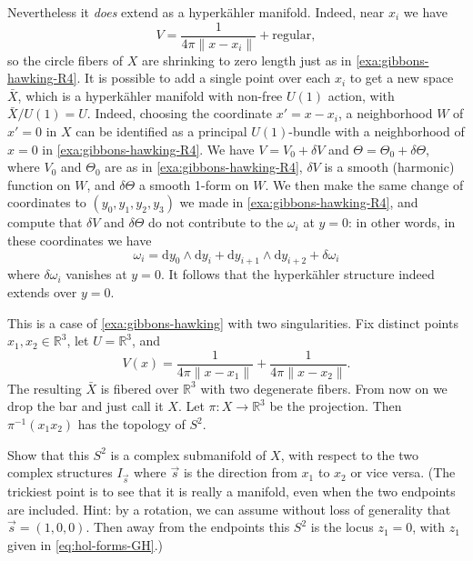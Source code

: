 \documentclass[12pt,letterpaper,reqno]{article}
\numberwithin{equation}{section}
\newcommand{\R}{\ensuremath{\mathbb R}}
\newcommand{\hk}{hyperk\"ahler\xspace}
\newcommand{\de}{\mathrm{d}}
\newcommand{\norm}[1]{\lVert#1\rVert}
\newcommand{\ti}[1]{\textit{#1}}
\newcommand{\insfig}[2]{

\medskip
\noindent
\begin{minipage}{\linewidth}

\makebox[\linewidth]{\texttt{[image: figures/\#1-crop.pdf]}}

\end{minipage}
\medskip

}
\begin{document}
\begin{example}
Nevertheless it \ti{does} extend as a \hk manifold.
Indeed, near $x_i$ we have
\begin{equation}
V = \frac{1}{4\pi\norm{x - x_i}} + \text{regular},
\end{equation}
so the circle fibers of $X$ are shrinking to zero
length just as in \autoref{exa:gibbons-hawking-R4}.
It is possible to add a single point over each $x_i$
to get a new space $\bar X$, which is a \hk manifold with non-free
$U(1)$ action, with $\bar X / U(1) = U$.
Indeed, choosing the coordinate $x' = x - x_i$,
a neighborhood $W$ of $x' = 0$ in $X$ can be identified as a
principal $U(1)$-bundle with a neighborhood of $x = 0$
in \autoref{exa:gibbons-hawking-R4}. We have
$V = V_0 + \delta V$ and $\Theta = \Theta_0 + \delta \Theta$,
where $V_0$ and $\Theta_0$ are as in \autoref{exa:gibbons-hawking-R4},
$\delta V$ is a smooth (harmonic) function on $W$,
and $\delta \Theta$ a smooth 1-form on $W$.
We then make the same change of coordinates
to $(y_0,y_1,y_2,y_3)$ we made in
\autoref{exa:gibbons-hawking-R4}, and compute that $\delta V$
and $\delta \Theta$ do not contribute to the $\omega_i$ at
$y=0$: in other words, in these coordinates we have
\begin{equation} \label{eq:gibbons-hawking-near-singularity}
  \omega_i = \de y_0 \wedge \de y_i + \de y_{i+1} \wedge \de y_{i+2} + \delta \omega_i
\end{equation}
where $\delta \omega_i$ vanishes at $y = 0$. It follows
that the \hk structure indeed extends over $y = 0$.
\end{example}

\begin{example} \label{exa:eguchi-hanson}
This is a case of \autoref{exa:gibbons-hawking}
with two singularities. Fix distinct points
$x_1, x_2 \in \R^3$, let $U = \R^3$, and
\begin{equation}
  V(x) = \frac{1}{4\pi \norm{x - x_1}} + \frac{1}{4\pi \norm{x - x_2}}.
\end{equation}
The resulting $\bar X$ is fibered over $\R^3$ with two degenerate fibers.
From now on we drop the bar and just call it $X$.
Let $\pi: X \to \R^3$ be the projection.
Then $\pi^{-1}(x_1 x_2)$ has the topology of $S^2$.
\end{example}

\insfig{higgs-bundles-3}{0.8}

\begin{exercise}
Show that this $S^2$ is a complex submanifold of $X$, with
respect to the two complex structures $I_{\vec s}$ where $\vec s$
is the direction from $x_1$ to $x_2$ or vice versa.
(The trickiest point is to see that it is really a manifold,
even when the two endpoints are included. Hint: by a rotation,
we can assume without loss of generality that $\vec s = (1,0,0)$.
Then away from the endpoints this $S^2$ is the locus
$z_1 = 0$, with $z_1$ given in \eqref{eq:hol-forms-GH}.)
\end{exercise}
\end{document}
